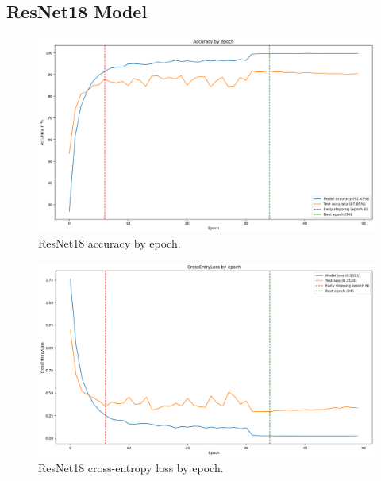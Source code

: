 \subsection*{ResNet18 Model}
\label{app:appendix_resnet_model}
\begin{figure}
    \centering
    \includegraphics[width=1\textwidth]{assets/resnet_accuracy.png}
    \caption{ResNet18 accuracy by epoch.}
    \label{fig:resnet_accuracy}
\end{figure}
\begin{figure}
    \centering
    \includegraphics[width=1\textwidth]{assets/resnet_loss.png}
    \caption{ResNet18 cross-entropy loss by epoch.}
    \label{fig:resnet_loss}
\end{figure}

